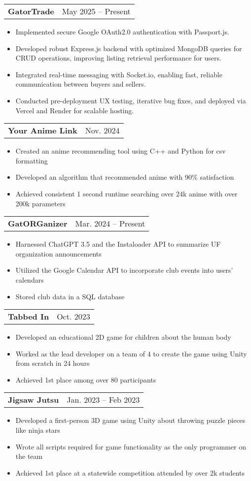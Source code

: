 \documentclass[letterpaper,11pt]{article}
\makeatletter
\newcommand{\resumeItem}[1]{
  \item\small{
    {#1 \vspace{-2pt}}
  }
}
\newcommand{\resumeSubSubheading}[2]{
    \item
    \begin{tabular*}{\textwidth}{l@{\extracolsep{\fill}}r}
      \textit{\small#1} & \textit{\small #2} \\
    \end{tabular*}\vspace{-7pt}
}
\newcommand{\resumeProjectHeading}[2]{
    \item
    \begin{tabular*}{\textwidth}{l@{\extracolsep{\fill}}r}
      \textbf{#1} & #2 \\
    \end{tabular*}\vspace{-7pt}
}
\newcommand{\resumeSubHeadingListEnd}{\end{itemize}}
\newcommand{\resumeItemListStart}{\begin{itemize}[leftmargin=0.15in]}
\newcommand{\resumeItemListEnd}{\end{itemize}\vspace{-5pt}}
\makeatother
\begin{document}
      \resumeProjectHeading
      {GatorTrade}{May 2025 -- Present}
      \resumeItemListStart
        \resumeItem{Implemented secure Google OAuth2.0 authentication with Passport.js.}
        \resumeItem{Developed robust Express.js backend with optimized MongoDB queries for CRUD operations, improving listing retrieval performance for users.}
        \resumeItem{Integrated real-time messaging with Socket.io, enabling fast, reliable communication between buyers and sellers.}
        \resumeItem{Conducted pre-deployment UX testing, iterative bug fixes, and deployed via Vercel and Render for scalable hosting.}
      \resumeItemListEnd

    \resumeProjectHeading
      {Your Anime Link}{Nov. 2024}
      \resumeItemListStart
        \resumeItem{Created an anime recommending tool using C++ and Python for csv formatting}
        \resumeItem{Developed an algorithm that recommended anime with 90\% satisfaction}
        \resumeItem{Achieved consistent 1 second runtime searching over 24k anime with over 200k parameters}
    \resumeItemListEnd

    \resumeProjectHeading
      {GatORGanizer}{Mar. 2024 -- Present}
      \resumeItemListStart
        \resumeItem{Harnessed ChatGPT 3.5 and the Instaloader API to summarize UF organization announcements}
        \resumeItem{Utilized the Google Calendar API to incorporate club events into users' calendars}
        \resumeItem{Stored club data in a SQL database}
      \resumeItemListEnd

      \resumeProjectHeading
      {Tabbed In}{Oct. 2023}
      \resumeItemListStart
        \resumeItem{Developed an educational 2D game for children about the human body}
        \resumeItem{Worked as the lead developer on a team of 4 to create the game using Unity from scratch in 24 hours}
        \resumeItem{Achieved 1st place among over 80 participants}
    \resumeItemListEnd

    \resumeProjectHeading
      {Jigsaw Jutsu}{Jan. 2023 -- Feb 2023}
      \resumeItemListStart
        \resumeItem{Developed a first-person 3D game using Unity about throwing puzzle pieces like ninja stars }
        \resumeItem{Wrote all scripts required for game functionality as the only programmer on the team}
        \resumeItem{Achieved 1st place at a statewide competition attended by over 2k students}
    \resumeItemListEnd
\end{document}

